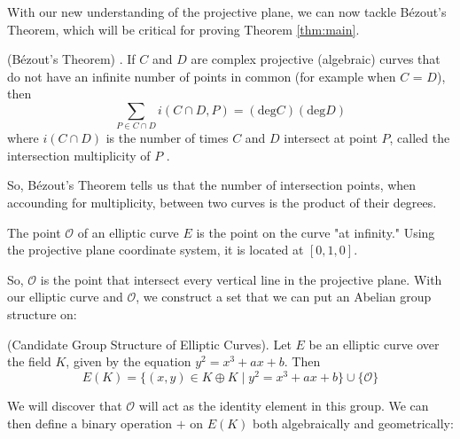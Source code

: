 \documentclass[]{../../math_paper}
\begin{document}
With our new understanding of the projective plane, we can now tackle Bézout's Theorem, which will be critical for proving Theorem \ref{thm:main}.

\begin{theorem} (Bézout's Theorem) \cite{Fitchett}. If $C$ and $D$ are complex projective (algebraic) curves that do not have an infinite number of points in common (for example when $C$ = $D$), then \begin{equation*}
        \sum_{P \in C \cap D}i(C \cap D, P) = (\mathrm{deg}C)(\mathrm{deg}D)
    \end{equation*}
    where $i(C \cap D)$ is the number of times $C$ and $D$ intersect at point $P$, called the intersection multiplicity of $P$ \cite{nichols2013intersection}.
\end{theorem}

So, Bézout's Theorem tells us that the number of intersection points, when accounding for multiplicity, between two curves is the product of their degrees.
\begin{definition} The point $\mathcal{O}$ of an elliptic curve $E$ is the point on the curve "at infinity." Using the projective plane coordinate system, it is located at $[0, 1, 0]$.
\end{definition}

So, $\mathcal{O}$ is the point that intersect every vertical line in the projective plane. With our elliptic curve and $\mathcal{O}$, we construct a set that we can put an Abelian group structure on:

\begin{definition} (Candidate Group Structure of Elliptic Curves). Let $E$ be an elliptic curve over the field $K$, given by the equation $y^2 = x^3 + ax + b$. Then
    $$E(K) = \{(x, y) \in K \oplus K \mid y^2 = x^3 + ax + b\} \cup \{\mathcal{O}\}$$
\end{definition}

We will discover that $\mathcal{O}$ will act as the identity element in this group. We can then define a binary operation $+$ on $E(K)$ both algebraically and geometrically:
\end{document}
